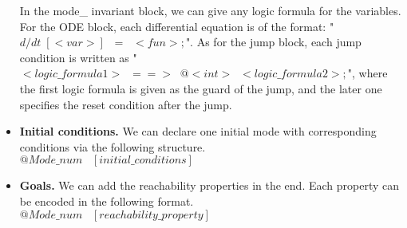 \documentclass[runningheads,a4paper]{llncs}
\begin{document}
\begin{itemize}
In the mode\_ invariant block, we can give any logic formula for the variables. For the ODE block, each differential equation is of the format: "$d/dt \; [<var>]\;\;=\;\;<fun>;$". As for the jump block, each jump condition is written as "$<logic\_formula1> \;\; ==> \;\; @<int>\;\;<logic\_formula2>;$", where the first logic formula is given as the guard of the jump, and the later one specifies the reset condition after the jump.\\

\item {\bf Initial conditions.} We can declare one initial mode with corresponding conditions via the following structure.\\

$
@Mode\_num\;\;\; [initial\_conditions]
$\\

\item{\bf Goals.} We can add the reachability properties in the end. Each property can be encoded in the following format.\\

$
@Mode\_num \;\;\; [reachability\_property]
$\\

\end{itemize}
\end{document}
